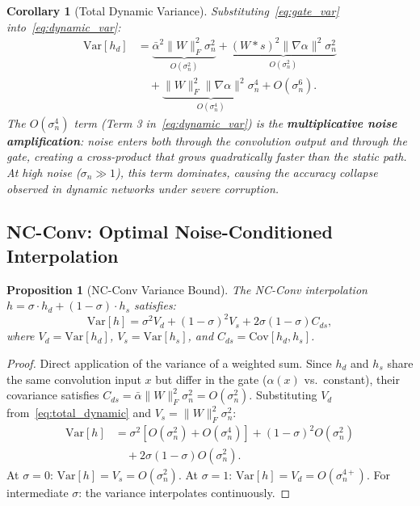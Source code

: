 \documentclass[journal]{IEEEtran}
\newtheorem{proposition}{Proposition}
\newtheorem{corollary}{Corollary}
\begin{document}
\begin{corollary}[Total Dynamic Variance]
\label{cor:total_dynamic}
Substituting~\eqref{eq:gate_var} into~\eqref{eq:dynamic_var}:
\begin{align}
\text{Var}[h_d] &= \underbrace{\bar{\alpha}^2 \|W\|_F^2 \sigma_n^2}_{O(\sigma_n^2)} + \underbrace{(W*s)^2 \|\nabla\alpha\|^2 \sigma_n^2}_{O(\sigma_n^2)} \nonumber \\
&\quad + \underbrace{\|W\|_F^2 \|\nabla\alpha\|^2 \sigma_n^4}_{O(\sigma_n^4)} + O(\sigma_n^6).
\label{eq:total_dynamic}
\end{align}
The $O(\sigma_n^4)$ term (Term 3 in~\eqref{eq:dynamic_var}) is the \textbf{multiplicative noise amplification}: noise enters \emph{both} through the convolution output and through the gate, creating a cross-product that grows quadratically faster than the static path.
At high noise ($\sigma_n \gg 1$), this term dominates, causing the accuracy collapse observed in dynamic networks under severe corruption.
\end{corollary}

\subsection{NC-Conv: Optimal Noise-Conditioned Interpolation}

\begin{proposition}[NC-Conv Variance Bound]
\label{prop:nc}
The NC-Conv interpolation $h = \sigma \cdot h_d + (1-\sigma) \cdot h_s$ satisfies:
\begin{equation}
\text{Var}[h] = \sigma^2 V_d + (1{-}\sigma)^2 V_s + 2\sigma(1{-}\sigma) C_{ds},
\label{eq:nc_var}
\end{equation}
where $V_d = \text{Var}[h_d]$, $V_s = \text{Var}[h_s]$, and $C_{ds} = \text{Cov}[h_d, h_s]$.
\end{proposition}

\begin{proof}
Direct application of the variance of a weighted sum.
Since $h_d$ and $h_s$ share the same convolution input $x$ but differ in the gate ($\alpha(x)$ vs.\ constant), their covariance satisfies $C_{ds} = \bar{\alpha} \|W\|_F^2 \sigma_n^2 = O(\sigma_n^2)$.
Substituting $V_d$ from~\eqref{eq:total_dynamic} and $V_s = \|W\|_F^2 \sigma_n^2$:
\begin{align}
\text{Var}[h] &= \sigma^2 [O(\sigma_n^2) + O(\sigma_n^4)] + (1{-}\sigma)^2 O(\sigma_n^2) \nonumber \\
&\quad + 2\sigma(1{-}\sigma) O(\sigma_n^2).
\end{align}
At $\sigma = 0$: $\text{Var}[h] = V_s = O(\sigma_n^2)$.
At $\sigma = 1$: $\text{Var}[h] = V_d = O(\sigma_n^{4+})$.
For intermediate $\sigma$: the variance interpolates continuously.
\end{proof}
\end{document}
